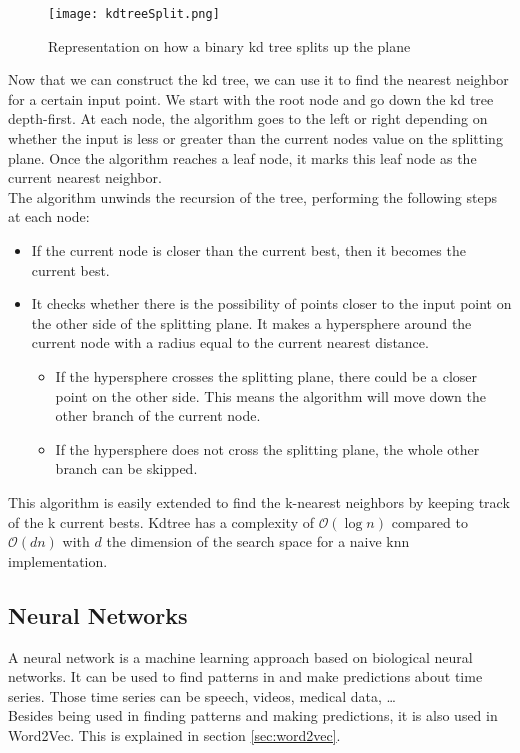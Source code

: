 \begin{figure}[!htb]
	\centering
	\texttt{[image: kdtreeSplit.png]}
	\caption{Representation on how a binary kd tree splits up the plane  \cite{kdtreeIntro:atricle}}
	\label{fig:kdtreeSplit}
\end{figure}


Now that we can construct the kd tree, we can use it to find the nearest neighbor for a certain input point. We start with the root node and go down the kd tree depth-first. At each node, the algorithm goes to the left or right depending on whether the input is less or greater than the current nodes value on the splitting plane. Once the algorithm reaches a leaf node, it marks this leaf node as the current nearest neighbor. \\
The algorithm unwinds the recursion of the tree, performing the following steps at each node:
\begin{itemize}

\item If the current node is closer than the current best, then it becomes the current best.
\item It checks whether there is the possibility of points closer to the input point on the other side of the splitting plane. It makes a hypersphere around the current node with a radius equal to the current nearest distance. 
\begin{itemize}
\item If the hypersphere crosses the splitting plane, there could be a closer point on the other side. This means the algorithm will move down the other branch of the current node.
\item If the hypersphere does not cross the splitting plane, the whole other branch can be skipped.
\end{itemize}
\end{itemize}

This algorithm is easily extended to find the k-nearest neighbors by keeping track of the k current bests. Kdtree has a complexity of $\mathcal{O}(\log{}n)$ compared to $\mathcal{O}(dn)$ with $d$ the dimension of the search space for a naive knn implementation.
	
	\subsection{Neural Networks}
	
A neural network is a machine learning approach based on biological neural networks. It can be used to find patterns in and make predictions about time series. Those time series can be speech, videos, medical data, \ldots \\
Besides being used in finding patterns and making predictions, it is also used in Word2Vec. This is explained in section \ref{sec:word2vec}.


